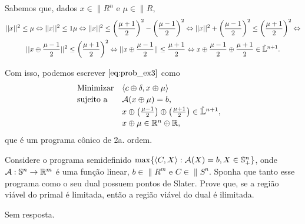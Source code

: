 \begin{homeworkProblemAnswer}
Sabemos que, dados $x \in \|{R}^n$ e $\mu \in \|{R}$,
\begin{multline*}
    ||x||^2 \leq \mu \sse 
    ||x||^2 \leq 1\mu \sse 
    ||x||^2 \leq \left(\dfrac{\mu+1}{2}\right)^2 - \left(\dfrac{\mu-1}{2}\right)^2 \sse 
    ||x||^2  + \left(\dfrac{\mu-1}{2}\right)^2 \leq \left(\dfrac{\mu+1}{2}\right)^2 \sse \\
    ||x \oplus \dfrac{\mu-1}{2}||^2 \leq \left(\dfrac{\mu+1}{2}\right)^2 \sse 
    ||x \oplus \dfrac{\mu-1}{2}|| \leq \dfrac{\mu+1}{2} \sse
    x \oplus \dfrac{\mu-1}{2} \oplus \dfrac{\mu+1}{2} \in \hat{\|{L}}^{n+1}.
\end{multline*}

Com isso, podemos escrever $\eqref{eq:prob_ex3}$ como
\begin{equation*} 
    \begin{array}[!h]{lll}
        \text{Minimizar} & \langle c \oplus \delta, x \oplus \mu \rangle    & \\[2pt]
        \text{sujeito a} & \"{A}(x \oplus \mu) = b,                          & \\[2pt]
                         & x \oplus \left( \frac{\mu-1}{2} \right) \oplus \left( \frac{\mu+1}{2} \right) \in \hat{\|{L}}^{n+1}, & \\[2pt]
                         & x \oplus \mu \in \|{R}^n \oplus \|{R},           & \\
    \end{array}
\end{equation*}
que é um programa cônico de 2a. ordem.
\end{homeworkProblemAnswer}

\begin{homeworkProblem}
Considere o programa semidefinido $\max\{ \langle C, X \rangle : \"{A}(X) = b, X \in \|{S}_+^n \}$, onde $\"{A} : \|{S}^n \rightarrow \|{R}^m$ é uma função linear, $b \in \|{R}^m$ e $C \in \|{S}^n$. Sponha que tanto esse programa como o seu dual possuem pontos de Slater. Prove que, se a região viável do primal é limitada, então a região viável do dual é ilimitada.
\end{homeworkProblem}

\begin{homeworkProblemAnswer}
Sem resposta.
\end{homeworkProblemAnswer}

